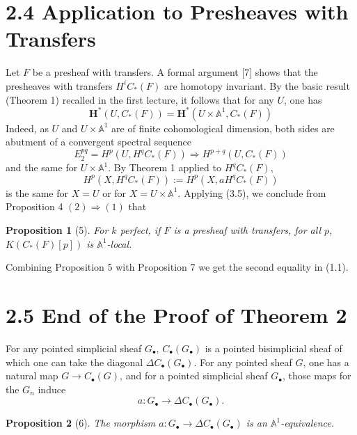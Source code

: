 \documentclass[11pt]{article}
\newcommand{\Aone}{\mathbb A^1}
\theoremstyle{deligne}
\newtheorem*{proposition*}{Proposition}
\begin{document}
\section*{2.4 Application to Presheaves with Transfers}

Let \(F\) be a presheaf with transfers. A formal argument [7] shows that the presheaves with transfers \(H^i C_*(F)\) are homotopy invariant. By the basic result (Theorem 1) recalled in the first lecture, it follows that for any \(U\), one has
\[
\mathbf H^*(U,C_*(F))=\mathbf H^*(U\times\Aone,C_*(F)) \tag{4.1}
\]
Indeed, as \(U\) and \(U\times\Aone\) are of finite cohomological dimension, both sides are abutment of a convergent spectral sequence
\[
E_2^{pq}=H^p(U,H^qC_*(F))\Rightarrow H^{p+q}(U,C_*(F))
\]
and the same for \(U\times\Aone\). By Theorem 1 applied to \(H^qC_*(F)\),
\[
H^p(X,H^qC_*(F)):=H^p(X,aH^qC_*(F))
\]
is the same for \(X=U\) or for \(X=U\times\Aone\). Applying (3.5), we conclude from Proposition 4 \((2)\Rightarrow(1)\) that

\begin{proposition*}[5]
For \(k\) perfect, if \(F\) is a presheaf with transfers, for all \(p\), \(K(C_*(F)[p])\) is \(\Aone\)-local.
\end{proposition*}

Combining Proposition 5 with Proposition 7 we get the second equality in (1.1).

\section*{2.5 End of the Proof of Theorem 2}

For any pointed simplicial sheaf \(G_\bullet\), \(C_\bullet(G_\bullet)\) is a pointed bisimplicial sheaf of which one can take the diagonal \(\Delta C_\bullet(G_\bullet)\). For any pointed sheaf \(G\), one has a natural map \(G\to C_\bullet(G)\), and for a pointed simplicial sheaf \(G_\bullet\), those maps for the \(G_n\) induce
\[
a:G_\bullet\longrightarrow \Delta C_\bullet(G_\bullet).
\]

\begin{proposition*}[6]
The morphism \(a:G_\bullet\to\Delta C_\bullet(G_\bullet)\) is an \(\Aone\)-equivalence.
\end{proposition*}
\end{document}
